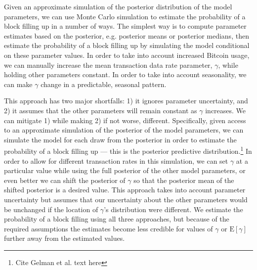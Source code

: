 \documentclass{article}
\begin{document}
Given an approximate simulation of the posterior distribution of the model parameters, we can use Monte Carlo simulation to estimate the probability of a block filling up in a number of ways. The simplest way is to compute parameter estimates based on the posterior, e.g. posterior means or posterior medians, then estimate the probability of a block filling up by simulating the model conditional on these parameter values. In order to take into account increased Bitcoin usage, we can manually increase the mean transaction data rate parameter, $\gamma$, while holding other parameters constant. In order to take into account seasonality, we can make $\gamma$ change in a predictable, seasonal pattern.

This approach has two major shortfalls: 1) it ignores parameter uncertainty, and 2) it assumes that the other parameters will remain constant as $\gamma$ increases. We can mitigate 1) while making 2) if not worse, different. Specifically, given access to an approximate simulation of the posterior of the model parameters, we can simulate the model for each draw from the posterior in order to estimate the probability of a block filling up --- this is the posterior predictive distribution.\footnote{Cite Gelman et al. text here} In order to allow for different transaction rates in this simulation, we can set $\gamma$ at a particular value while using the full posterior of the other model parameters, or even better we can shift the posterior of $\gamma$ so that the posterior mean of the shifted posterior is a desired value. This approach takes into account parameter uncertainty but assumes that our uncertainty about the other parameters would be unchanged if the location of $\gamma$'s distribution were different. We estimate the probability of a block filling using all three approaches, but because of the required assumptions the estimates become less credible for values of $\gamma$ or $\mathrm{E}[\gamma]$ further away from the estimated values.
\end{document}
